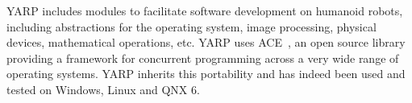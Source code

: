 YARP includes modules to facilitate software development on
humanoid robots, including abstractions for the operating system,
image processing, physical devices, mathematical operations, etc.
%
%
YARP uses ACE~\cite{ACEBook}, an open source library providing a framework for
concurrent programming across a very wide range of operating
systems. YARP inherits this portability and has indeed been used and
tested on Windows, Linux and QNX 6.


